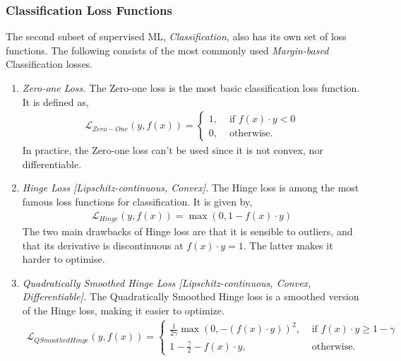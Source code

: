 \documentclass{article}
\begin{document}
\subsubsection{Classification Loss Functions}%
  \label{sub:Classification Loss Functions}
  The second subset of supervised ML, \textit{Classification}, also has its own set of loss functions. The following consists of the most commonly used \textit{Margin-based} Classification losses. 
  \begin{enumerate}
    \item \textit{Zero-one Loss.} The Zero-one loss is the most basic classification loss function. It is defined as, 
    \begin{equation}
      \begin{split}
        \mathcal{L}_{Zero-One}(y, f(x)) = 
        \begin{cases}
          1, &\text{ if } f(x) \cdot y < 0 \\ 
          0, &\text{ otherwise.} 
        \end{cases}
      \end{split}
    \end{equation}
    In practice, the Zero-one loss can't be used since it is not convex, nor differentiable.
    \item \textit{Hinge Loss [Lipschitz-continuous, Convex].} The Hinge loss is among the most famous loss functions for classification. It is given by, 
 \begin{equation}
      \begin{split}
        \mathcal{L}_{Hinge}(y, f(x)) = \max(0, 1-f(x)\cdot y)
      \end{split}
    \end{equation}
    The two main drawbacks of Hinge loss are that it is sensible to outliers, and that its derivative is discontinuous at $f(x)\cdot y = 1$. The latter makes it harder to optimise.
    \item \textit{Quadratically Smoothed Hinge Loss [Lipschitz-continuous, Convex, Differentiable].} The Quadratically Smoothed Hinge loss is a smoothed version of the Hinge loss, making it easier to optimize.
\begin{equation}
      \begin{split}
        \mathcal{L}_{QSmoothedHinge}(y, f(x)) = 
        \begin{cases}
          \frac{1}{2\gamma} \max(0, -(f(x)\cdot y))^2 , &\text{ if } f(x)\cdot y \geq 1 -\gamma\\
          1 -\frac{\gamma}{2} -f(x)\cdot y, &\text{ otherwise.}  

\end{cases}
\end{split}
\end{equation}
\end{enumerate}
\end{document}
